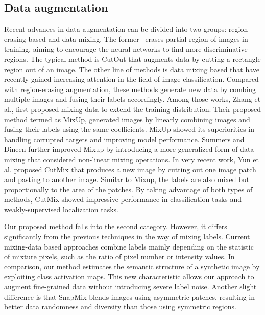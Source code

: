 \documentclass[letterpaper]{article} \usepackage{aaai21}  \usepackage{times}  \usepackage{helvet} \usepackage{courier}  \usepackage[hyphens]{url}  \usepackage{graphicx} \urlstyle{rm} \def\UrlFont{\rm}  \usepackage{natbib}  \usepackage{caption} \frenchspacing  \setlength{\pdfpagewidth}{8.5in}  \setlength{\pdfpageheight}{11in}
\begin{document}
\subsection{Data augmentation} 
Recent advances \cite{takahashi2019data,zhong2017random,devries2017improved,tokozume2018between,inoue2018data,zhang2017mixup,yun2019cutmix}  in data augmentation can be divided into two groups: region-erasing based and data mixing.  The former~\cite{zhong2017random,devries2017improved} erases partial region of images in training, aiming to encourage the neural networks to find more discriminative regions. The typical method is CutOut that augments data by cutting a rectangle region out of an image. The other line of methods is data mixing based \cite{tokozume2018between,inoue2018data,zhang2017mixup} that have recently gained increasing attention in the field of image classification. Compared with region-erasing augmentation, these methods generate new data by combing multiple images and fusing their labels accordingly. Among those works, Zhang et al., \cite{zhang2017mixup}  first proposed mixing data to extend the training distribution. Their proposed method termed as MixUp, generated images by linearly combining images and fusing their labels using the same coefficients. MixUp showed its superiorities in handling corrupted targets and improving model performance.  Summers and Dineen \cite{summers2019improved} further improved Mixup by introducing a more generalized form of data mixing that considered non-linear mixing operations. In very recent work, Yun et al. proposed CutMix \cite{yun2019cutmix} that produces a new image by cutting out one image patch and pasting to another image. Similar to Mixup, the labels are also mixed but proportionally to the area of the patches. By taking advantage of both types of methods, CutMix showed impressive performance in classification tasks and weakly-supervised localization tasks. 

Our proposed method falls into the second category. However, it differs significantly from the previous techniques in the way of mixing labels.  Current mixing-data based approaches combine labels mainly depending on the statistic of mixture pixels, such as the ratio of pixel number or intensity values. In comparison, our method estimates the semantic structure of a synthetic image by exploiting class activation maps. This new characteristic allows our approach to augment fine-grained data without introducing severe label noise. Another slight difference is that SnapMix blends images using asymmetric patches,  resulting in better data randomness and diversity than those using symmetric regions.
\end{document}
